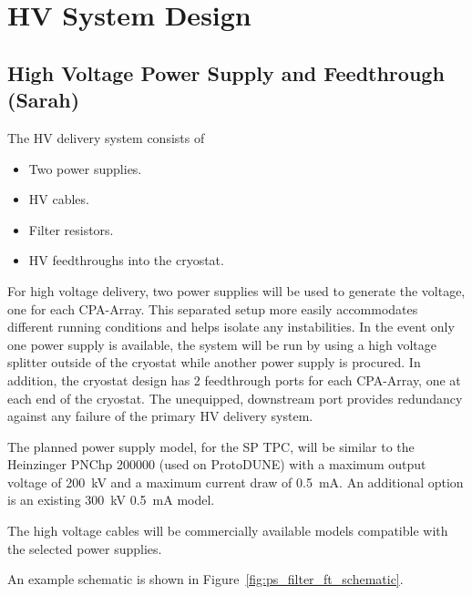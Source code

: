 \section{HV System Design}
\label{sec:fdsp-hv-design}

\subsection {High Voltage Power Supply and Feedthrough (Sarah)}
The HV delivery system consists of
\begin{itemize}
\item Two power supplies.
\item HV cables.
\item Filter resistors.
\item HV feedthroughs into the cryostat.
\end{itemize}

For high voltage delivery, two power supplies will be used to generate the voltage, one for each CPA-Array. This separated setup more easily accommodates different running conditions and helps isolate any instabilities.  In the event only one power supply is available, the system will be run by using a high voltage splitter outside of the cryostat while another power supply is procured. In addition, the cryostat design has 2 feedthrough ports for each CPA-Array, one at each end of the cryostat. The unequipped, downstream port provides redundancy against any failure of the primary HV delivery system.

The planned power supply model, for the SP TPC, will be similar to the Heinzinger PNChp 200000 (used on ProtoDUNE) with a maximum output voltage of \SI{200}{kV} and a maximum current draw of \SI{0.5}{mA}.  An additional option is an existing \SI{300}{kV} \SI{0.5}{mA} model. 


The high voltage cables will be commercially available models compatible with the selected power supplies. 

An example schematic is shown in Figure~\ref{fig:ps_filter_ft_schematic}.

